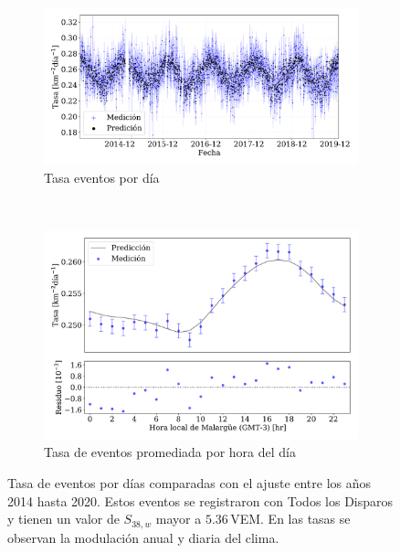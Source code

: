 \begin{figure}[H]
  \centering
  \begin{subfigure}[b]{0.9\textwidth}
  \includegraphics[width=\textwidth]{Graphs/rate_dayly/AllTriggers_S38_over_1EeV_rate_v3.pdf}
  \caption{Tasa eventos por día}\label{fig:rate_dayly_AllTriggers}
  \end{subfigure}\\
  \begin{subfigure}[b]{0.9\textwidth}
  \includegraphics[width=\textwidth]{Graphs/rate_hour_of_the_day/AllTriggers_S38_over_1EeV_hour_of_the_day.pdf}
  \caption{Tasa de eventos promediada por hora del día }\label{fig:rate_hod_AllTriggers}
  \end{subfigure}
  \caption{Tasa de eventos por días comparadas con el ajuste entre los años 2014 hasta 2020. Estos eventos se registraron con Todos los Disparos  y tienen un valor de $S_{38,w}$ mayor a $5.36\,$VEM. En las tasas se observan la modulación anual y diaria del clima. }\label{fig:rate__AllTriggers}
\end{figure}

